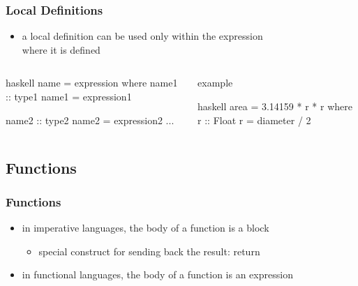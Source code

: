 \documentclass[dvipsnames]{beamer}
\theoremstyle{plain}
\begin{document}
\begin{frame}[fragile]
  \frametitle{Local Definitions}

  \medskip
  \begin{itemize}
    \item a \alert{local} definition can be used only within the expression\\
      where it is defined
  \end{itemize}

  \begin{columns}[b]
    \begin{block}{}
      \begin{pygments}{haskell}
name = expression
  where
    name1 :: type1
    name1 = expression1

    name2 :: type2
    name2 = expression2
    ...
      \end{pygments}
    \end{block}

    \pause
    \begin{exampleblock}{example}
      \begin{pygments}{haskell}
area = 3.14159 * r * r
  where
    r :: Float
    r = diameter / 2
      \end{pygments}
    \end{exampleblock}
  \end{columns}
\end{frame}

\subsection{Functions}

\begin{frame}
  \frametitle{Functions}

  \begin{itemize}
    \item in imperative languages, the body of a function is a block
    \begin{itemize}
      \item special construct for sending back the result: \alert{return}
    \end{itemize}

    \pause
    \bigskip
    \item in functional languages, the body of a function is an expression
  \end{itemize}
\end{frame}
\end{document}
